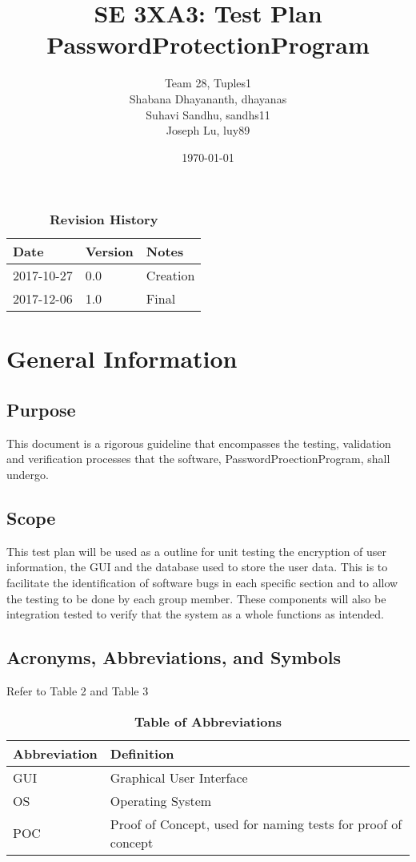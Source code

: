 \documentclass[12pt, titlepage]{article}
\title{SE 3XA3: Test Plan\\PasswordProtectionProgram}
\author{Team 28, Tuples1
		\\ Shabana Dhayananth, dhayanas
		\\ Suhavi Sandhu, sandhs11
		\\ Joseph Lu, luy89
}
\date{\today}
\begin{document}
\maketitle

\tableofcontents
\listoftables
\listoffigures

\begin{table}[bp]
\caption{\bf Revision History}
\begin{tabularx}{\textwidth}{p{3cm}p{2cm}X}
\toprule {\bf Date} & {\bf Version} & {\bf Notes}\\
\midrule
2017-10-27 & 0.0 & Creation\\
2017-12-06 & 1.0 & Final\\
\bottomrule
\end{tabularx}
\end{table}

\newpage


\section{General Information}

\subsection{Purpose}
This document is a rigorous guideline that encompasses the testing, validation and verification processes that the software, PasswordProectionProgram, shall undergo.

\subsection{Scope}
This test plan will be used as a outline for unit testing the encryption of user information, the GUI and the database used to store the user data. This is to facilitate the identification of software bugs in each specific section and to allow the testing to be done by each group member. These components will also be integration tested to verify that the system as a whole functions as intended.


\subsection{Acronyms, Abbreviations, and Symbols}
Refer to Table 2 and Table 3
	
\begin{table}[hbp]
\caption{\textbf{Table of Abbreviations}} \label{0Table}

    \begin{tabularx}{\textwidth}{p{3cm}X}
        \toprule
        \textbf{Abbreviation} & \textbf{Definition} \\
        \midrule
        GUI & Graphical User Interface\\\hline
        OS & Operating System\\\hline
        POC & Proof of Concept, used for naming tests for proof of concept\\
        \bottomrule
    \end{tabularx}

\end{table}
\end{document}
